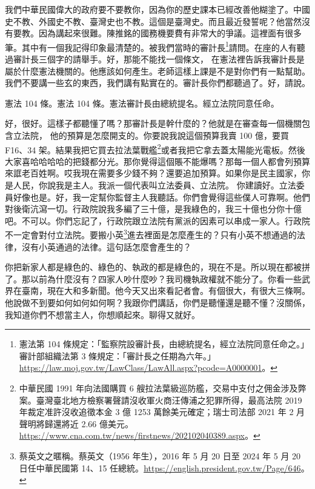 \hypertarget{c11:cue:13}{}我們中華民國偉大的政府要不要教你，因為你的歷史課本已經改善他糊塗了。中國史不教、外國史不教、臺灣史也不教。這個是臺灣史。而且最近發誓呢？他當然沒有要教。因為講起來很難。陳推銘的國務機要費有非常大的爭議。這裡面有很多筆。其中有一個我記得印象最清楚的。被我們當時的審計長\footnote{憲法第 104 條規定：「監察院設審計長，由總統提名，經立法院同意任命之。」審計部組織法第 3 條規定：「審計長之任期為六年。」\url{https://law.moj.gov.tw/LawClass/LawAll.aspx?pcode=A0000001}。}請問。在座的人有聽過審計長三個字的請舉手。好，那能不能找一個條文，
\hypertarget{c11:cue:14}{}在憲法裡告訴我審計長是屬於什麼憲法機關的。他應該如何產生。老師這樣上課是不是對你們有一點幫助。我們不要講一些玄的東西，我們講有點實在的。審計長你們都聽過了。好，請說。\par{}憲法 104 條。憲法 104 條。憲法審計長由總統提名。經立法院同意任命。\par{}好，很好。這樣子都聽懂了嗎？那審計長是幹什麼的？他就是在審查每一個機關包含立法院，
\hypertarget{c11:cue:15}{}他的預算是怎麼開支的。你要說我說這個預算我賣 100 億，要買 F16、34 架。結果我把它買去拉法葉戰艦\footnote{中華民國 1991 年向法國購買 6 艘拉法葉級巡防艦，交易中支付之佣金涉及弊案。臺灣臺北地方檢察署聲請沒收軍火商汪傳浦之犯罪所得，最高法院 2019 年裁定准許沒收追徵本金 3 億 1253 萬餘美元確定；瑞士司法部 2021 年 2 月聲明將歸還將近 2.66 億美元。\url{https://www.cna.com.tw/news/firstnews/202102040389.aspx}。}或者我把它拿去蓋太陽能光電板。然後大家喜哈哈哈哈的把錢都分光。那你覺得這個賬不能爆嗎？那每一個人都會列預算來誆老百姓啊。哎我現在需要多少錢不夠？還要追加預算。如果你是民主國家，你是人民，你說我是主人。我派一個代表叫立法委員、立法院。
\hypertarget{c11:cue:16}{}你建讀好。立法委員好像也是。好，我一定幫你監督主人我聽話。你們會覺得這些僕人可靠啊。他們對後衛沆瀉一切。行政院說我多編了三十億，是我綠色的，我三十億也分你十億吧。不可以。你們忘記了，行政院跟立法院有黨派的因素可以串成一家人。行政院不一定會對付立法院。要搬小英\footnote{蔡英文之暱稱。蔡英文（1956 年生），2016 年 5 月 20 日至 2024 年 5 月 20 日任中華民國第 14、15 任總統。\url{https://english.president.gov.tw/Page/646}。}進去裡面是怎麼產生的？只有小英不想通過的法律，沒有小英通過的法律。這句話怎麼會產生的？

\hypertarget{c11:cue:17}{}你把新家人都是綠色的、綠色的、執政的都是綠色的，現在不是。所以現在都被拼了。那以前為什麼沒有？四家人吵什麼吵？我司機執政權就不能分了。你看一些武界在臺南，現在大和多新聞。他今天又出來看記者會。有個很大，有很大三條啊。他說做不到要如何如何如何啊？我跟你們講話，你們是聽懂還是聽不懂？沒關係，我知道你們不想當主人，你想順起來。聊得又就好。

